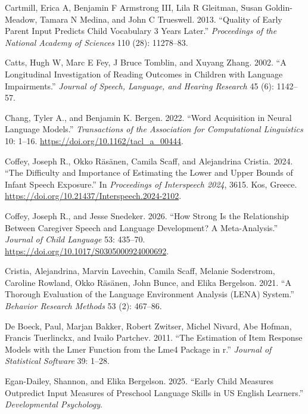 \documentclass[
  11pt,
]{article}
\newlength{\cslhangindent}
\newenvironment{CSLReferences}[2] %
 {\begin{list}{}{%
  \setlength{\itemindent}{0pt}
  \setlength{\leftmargin}{0pt}
  \setlength{\parsep}{0pt}
  \ifodd #1
   \setlength{\leftmargin}{\cslhangindent}
   \setlength{\itemindent}{-1\cslhangindent}
  \fi
  \setlength{\itemsep}{#2\baselineskip}}}
 {\end{list}}
\begin{document}
\begin{CSLReferences}{1}{0}
Cartmill, Erica A, Benjamin F Armstrong III, Lila R Gleitman, Susan
Goldin-Meadow, Tamara N Medina, and John C Trueswell. 2013. {``Quality
of Early Parent Input Predicts Child Vocabulary 3 Years Later.''}
\emph{Proceedings of the National Academy of Sciences} 110 (28):
11278--83.

Catts, Hugh W, Marc E Fey, J Bruce Tomblin, and Xuyang Zhang. 2002. {``A
Longitudinal Investigation of Reading Outcomes in Children with Language
Impairments.''} \emph{Journal of Speech, Language, and Hearing Research}
45 (6): 1142--57.

Chang, Tyler A., and Benjamin K. Bergen. 2022. {``Word Acquisition in
Neural Language Models.''} \emph{Transactions of the Association for
Computational Linguistics} 10: 1--16.
\url{https://doi.org/10.1162/tacl_a_00444}.

Coffey, Joseph R., Okko Räsänen, Camila Scaff, and Alejandrina Cristia.
2024. {``The Difficulty and Importance of Estimating the Lower and Upper
Bounds of Infant Speech Exposure.''} In \emph{Proceedings of Interspeech
2024}, 3615. Kos, Greece.
\url{https://doi.org/10.21437/Interspeech.2024-2102}.

Coffey, Joseph R., and Jesse Snedeker. 2026. {``How Strong Is the
Relationship Between Caregiver Speech and Language Development? {A}
Meta-Analysis.''} \emph{Journal of Child Language} 53: 435--70.
\url{https://doi.org/10.1017/S0305000924000692}.

Cristia, Alejandrina, Marvin Lavechin, Camila Scaff, Melanie Soderstrom,
Caroline Rowland, Okko Räsänen, John Bunce, and Elika Bergelson. 2021.
{``A Thorough Evaluation of the Language Environment Analysis (LENA)
System.''} \emph{Behavior Research Methods} 53 (2): 467--86.

De Boeck, Paul, Marjan Bakker, Robert Zwitser, Michel Nivard, Abe
Hofman, Francis Tuerlinckx, and Ivailo Partchev. 2011. {``The Estimation
of Item Response Models with the Lmer Function from the Lme4 Package in
r.''} \emph{Journal of Statistical Software} 39: 1--28.

Egan-Dailey, Shannon, and Elika Bergelson. 2025. {``Early Child Measures
Outpredict Input Measures of Preschool Language Skills in US English
Learners.''} \emph{Developmental Psychology}.


\end{CSLReferences}
\end{document}
